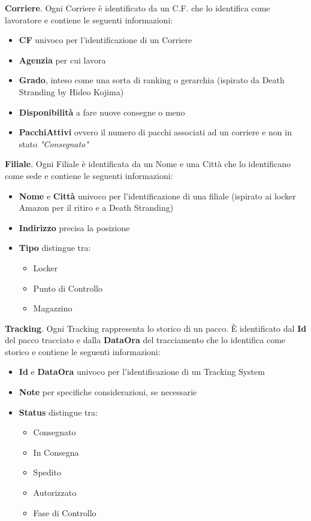 \textbf{Corriere}. Ogni Corriere è identificato da un C.F. che lo identifica come lavoratore e contiene le seguenti informazioni:
\begin{itemize}
    \setlength{\itemindent}{+.5in}
    \item \textbf{CF} univoco per l'identificazione di un Corriere
    \item \textbf{Agenzia} per cui lavora
    \item \textbf{Grado}, inteso come una sorta di ranking o gerarchia \footnotesize{(ispirato da Death Stranding by Hideo Kojima)}
    \item \normalsize{\textbf{Disponibilità}} a fare nuove consegne o meno
    \item \textbf{PacchiAttivi} ovvero il numero di pacchi associati ad un corriere e non in stato \textit{"Consegnato"}
\end{itemize}


\textbf{Filiale}. Ogni Filiale è identificata da un Nome e una Città che lo identificano come sede e contiene le seguenti informazioni:
\begin{itemize}
    \setlength{\itemindent}{+.5in}
    \item \textbf{Nome} e \textbf{Città} univoco per l'identificazione di una filiale \footnotesize{(ispirato ai locker Amazon per il ritiro e a Death Stranding)}
    \item \normalsize\textbf{Indirizzo} precisa la posizione
    \item \textbf{Tipo} distingue tra:
     \begin{itemize}
            \setlength{\itemindent}{+.5in}
            \item Locker
            \item Punto di Controllo
            \item Magazzino
        \end{itemize}
\end{itemize}

\textbf{Tracking}. Ogni Tracking rappresenta lo storico di un pacco. È identificato dal \textbf{Id} del pacco tracciato e dalla \textbf{DataOra} del tracciamento che lo identifica come storico e contiene le seguenti informazioni:
\begin{itemize}
    \setlength{\itemindent}{+.5in}
    \item \textbf{Id} e \textbf{DataOra} univoco per l'identificazione di un Tracking System
    \item \textbf{Note} per specifiche considerazioni, se necessarie
    \item \textbf{Status} distingue tra:
     \begin{itemize}
            \setlength{\itemindent}{+.5in}
            \item Consegnato
            \item In Consegna
            \item Spedito
            \item Autorizzato
            \item Fase di Controllo
        \end{itemize}
\end{itemize}



